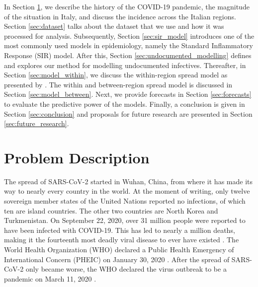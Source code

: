 \documentclass[12pt]{article}
\begin{document}
	In Section \ref{sec:problem_description}, we describe the history of the COVID-19 pandemic, the magnitude of the situation in Italy, and discuss the incidence across the Italian regions. Section \ref{sec:dataset} talks about the dataset that we use and how it was processed for analysis. Subsequently, Section \ref{sec:sir_model} introduces one of the most commonly used models in epidemiology, namely the Standard Inflammatory Response (SIR) model. After this, Section \ref{sec:undocumented_modelling} defines and explores our method for modelling undocumented infectives. Thereafter, in Section \ref{sec:model_within}, we discuss the within-region spread model as presented by \textcite{adda2016economic}. The within and between-region spread model is discussed in Section \ref{sec:model_between}. Next, we provide forecasts in Section \ref{sec:forecasts} to evaluate the predictive power of the models. Finally, a conclusion is given in Section \ref{sec:conclusion} and proposals for future research are presented in Section \ref{sec:future_research}.
	
	\section{Problem Description} \label{sec:problem_description}
	The spread of SARS-CoV-2 started in Wuhan, China, from where it has made its way to nearly every country in the world. At the moment of writing, only twelve sovereign member states of the United Nations reported no infections, of which ten are island countries. The other two countries are North Korea and Turkmenistan. %
	On September 22, 2020, over 31 million people were reported to have been infected with COVID-19. This has led to nearly a million deaths, making it the fourteenth most deadly viral disease to ever have existed \parencite{lepan2020historyPandemics}. The World Health Organization (WHO) declared a Public Health Emergency of International Concern (PHEIC) on January 30, 2020 \parencite{who2020pheic}.%
	After the spread of SARS-CoV-2 only became worse, the WHO declared the virus outbreak to be a pandemic on March 11, 2020 \parencite{who2020pandemic}. %
	\\
	
\end{document}
